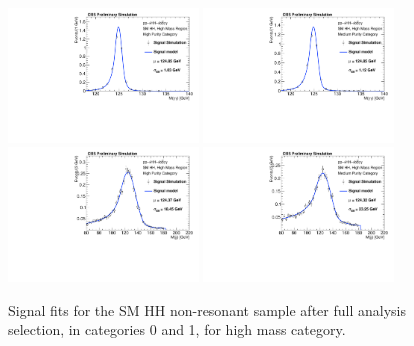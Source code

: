 \begin{figure}[h]
  \centering
  \includegraphics[width=0.45\textwidth]{figures/sec-signals/SMHM_signal_fit_mgg_cat0}\hfil
  \includegraphics[width=0.45\textwidth]{figures/sec-signals/SMHM_signal_fit_mgg_cat1}\hfil
  \includegraphics[width=0.45\textwidth]{figures/sec-signals/SMHM_signal_fit_mjj_cat0}\hfil
  \includegraphics[width=0.45\textwidth]{figures/sec-signals/SMHM_signal_fit_mjj_cat1}\hfil
  \caption{Signal fits for the SM HH non-resonant sample after full analysis selection, in categories 0 and 1, for high mass category.}
  \label{fig:sig_highmassSM}
\end{figure}

